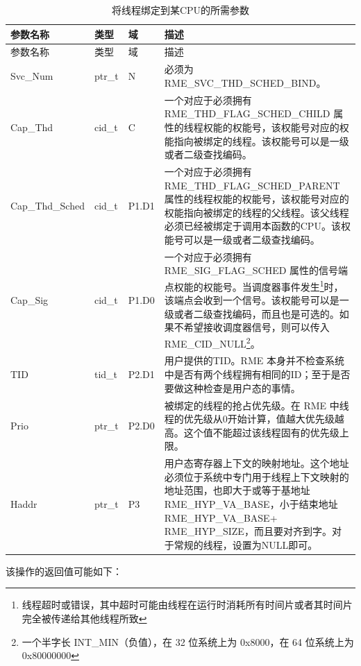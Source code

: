 \begin{xltabular}{\textwidth}{@{}>{\hsize\raggedright\arraybackslash}X>{\hsize\raggedright\arraybackslash}X>{\hsize\raggedright\arraybackslash}X>{\hsize\raggedright\arraybackslash}X@{}}
\caption{将线程绑定到某CPU的所需参数}\label{tab:4-24-bind-thread-to-cpu-parameters}\\
\toprule
参数名称 & 类型 & 域 & 描述\tabularnewline
\endfirsthead
\toprule
参数名称 & 类型 & 域 & 描述\tabularnewline
\midrule
\endhead
\bottomrule
\endlastfoot
Svc\_Num & ptr\_t & N & 必须为 RME\_SVC\_THD\_SCHED\_BIND。\tabularnewline
Cap\_Thd & cid\_t & C &
一个对应于必须拥有 RME\_THD\_FLAG\_SCHED\_CHILD 属性的线程权能的权能号，该权能号对应的权能指向被绑定的线程。该权能号可以是一级或者二级查找编码。\tabularnewline
Cap\_Thd\_Sched & cid\_t & P1.D1 &
一个对应于必须拥有 RME\_THD\_FLAG\_SCHED\_PARENT 属性的线程权能的权能号，该权能号对应的权能指向被绑定的线程的父线程。该父线程必须已经被绑定于调用本函数的CPU。该权能号可以是一级或者二级查找编码。\tabularnewline
Cap\_Sig & cid\_t & P1.D0 &
一个对应于必须拥有 RME\_SIG\_FLAG\_SCHED 属性的信号端点权能的权能号。当调度器事件发生\footnote{线程超时或错误，其中超时可能由线程在运行时消耗所有时间片或者其时间片完全被传递给其他线程所致}时，该端点会收到一个信号。该权能号可以是一级或者二级查找编码，而且也是可选的。如果不希望接收调度器信号，则可以传入 RME\_CID\_NULL\footnote{一个半字长 INT\_MIN（负值），在 32 位系统上为 0x8000，在 64 位系统上为 0x80000000}。\tabularnewline
TID & tid\_t & P2.D1 &
用户提供的TID。RME 本身并不检查系统中是否有两个线程拥有相同的ID；至于是否要做这种检查是用户态的事情。\tabularnewline
Prio & ptr\_t & P2.D0 &
被绑定的线程的抢占优先级。在 RME 中线程的优先级从0开始计算，值越大优先级越高。这个值不能超过该线程固有的优先级上限。\tabularnewline
Haddr & ptr\_t & P3 &
用户态寄存器上下文的映射地址。这个地址必须位于系统中专门用于线程上下文映射的地址范围，也即大于或等于基地址RME\_HYP\_VA\_BASE，小于结束地址RME\_HYP\_VA\_BASE+
RME\_HYP\_SIZE，而且要对齐到字。对于常规的线程，设置为NULL即可。\tabularnewline
\end{xltabular}

该操作的返回值可能如下：

